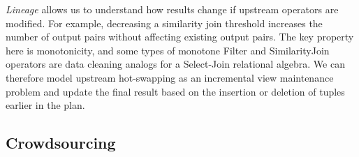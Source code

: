 \vspace{.4em}

\textit{Lineage} allows us to understand how results change if upstream operators are modified.
For example, decreasing a similarity join threshold increases the number of output pairs without affecting existing output pairs. The key property here is monotonicity, and some types of monotone \textsf{Filter} and \textsf{SimilarityJoin} operators are data cleaning analogs for a Select-Join relational algebra.
We can therefore model upstream hot-swapping as an incremental view maintenance problem and update the 
final result based on the insertion or deletion of tuples earlier in the plan.

\iffalse
\vspace{.5em}



\fi



\subsection{Crowdsourcing}


